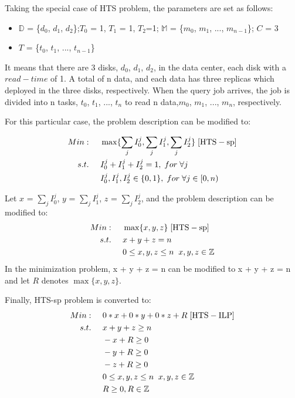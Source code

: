 \documentclass[conference]{IEEEtran}
\begin{document}
Taking the special case of HTS problem, the parameters are set as follows:
\begin{itemize}
	\item $\mathbb{D}$ = \{$d_0$, $d_1$, $d_2$\};$T_0$ = 1, $T_1$ = 1, $T_2$=1; $\mathbb{M}$ = \{$m_0$, $m_1$, ..., $m_{n-1}$\}; $C$ = 3
	\item $T$ = \{$t_0$, $t_1$, ..., $t_{n-1}$\}
\end{itemize}

It means that there are 3 disks, $d_0$, $d_1$, $d_2$, in the data center, each disk with a $read-time$ of 1. A total of n data, and each data has three replicas which deployed in the three disks, respectively. When the query job arrives, the job is divided into n tasks, $t_0$, $t_1$, ..., $t_n$ to read n data,$m_0$, $m_1$, ..., $m_n$, respectively.

For this particular case, the problem description can be modified to:

\begin{align}
Min:&\;\;\;\;\;\max\{\sum_{j}I_0^j, \sum_{j}I_1^j, \sum_{j}I_2^j\}\;[\rm{HTS-sp}]\\
s.t. 
&\;\;\;\;\;I_0^j + I_1^j +I_2^j= 1,\;for\;\forall j\nonumber\\
&\;\;\;\;\;I_0^j, I_1^j, I_2^j\in\{0,1\},\;for\;\forall j \in[0,n)\nonumber
\end{align}

Let  $x$ = $\sum_{j}I_0^j$, $y$ = $\sum_{j}I_1^j$, $z$ = $\sum_{j}I_2^j$, and the problem description can be modified to:
\begin{align}
Min:&\;\;\;\;\;\max\{x,y,z\}\;[\rm{HTS-sp}]\\
s.t. 
&\;\;\;\;\;x + y + z = n\;\label{enlarge-cons}\\
&\;\;\;\;\;0 \leq x, y, z \leq n  \;\;x, y, z\in\mathbb{Z}\nonumber
\end{align}
In the minimization problem, x + y + z = n can be modified to x + y + z = n and let $R$ denotes $\max\{x,y,z\}$. 

Finally, HTS-sp problem is converted to:
\begin{align}
Min:&\;\;\;\;\;0*x+0*y+0*z+R\;[\rm{HTS-ILP}]\label{HTS-ILP}\\
s.t. 
&\;\;\;\;\;x + y + z \geq n\;\nonumber\\
&\;\;\;\;\;-x + R \geq 0 \nonumber\\
&\;\;\;\;\;-y + R \geq 0  \nonumber\\
&\;\;\;\;\;-z + R \geq 0 \nonumber\\
&\;\;\;\;\;0 \leq x, y, z \leq n  \;\;x, y, z\in\mathbb{Z}\nonumber\\
&\;\;\;\;\;R \geq 0, R\in\mathbb{Z}\nonumber
\end{align}
\end{document}
